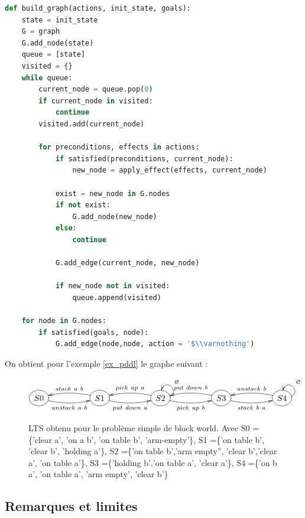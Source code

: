 \hfill
\begin{lstlisting}[language=Python, basicstyle=\small\ttfamily,
                   commentstyle=\color{gray}\itshape,
                   keywordstyle=\bfseries]
def build_graph(actions, init_state, goals):
    state = init_state
    G = graph
    G.add_node(state)
    queue = [state]
    visited = {}
    while queue:
        current_node = queue.pop(0)
        if current_node in visited:
            continue
        visited.add(current_node)

        for preconditions, effects in actions:
            if satisfied(preconditions, current_node):
                new_node = apply_effect(effects, current_node)

            exist = new_node in G.nodes
            if not exist:
                G.add_node(new_node)
            else:
                continue
            
            G.add_edge(current_node, new_node)

            if new_node not in visited:
                queue.append(visited)
    
    for node in G.nodes:
        if satisfied(goals, node):
            G.add_edge(node,node, action = '$\\varnothing')

\end{lstlisting}
\hfill

On obtient pour l'exemple \ref{ex_pddl} le graphe suivant :

\begin{figure}[h!]
    \[
        \xymatrix @R=0.1em @C=5em {
            *++[o][F-]{S0} \ar@/_/[r]_{unstack\ a\ b} & 
            *++[o][F-]{S1} \ar@/_/[l]_{stack\ a\ b} \ar@/_/[r]_{put\ down\ a} &
            *++[o][F-]{S2} \ar@/_/[l]_{pick\ up\ a} \ar@/_/[r]_{pick\ up\ b} \ar@(r,u)[]_{\varnothing} &
            *++[o][F-]{S3} \ar@/_/[l]_{put\ down\ b} \ar@/_/[r]_{stack\ b\ a} &
            *++[o][F-]{S4} \ar@/_/[l]_{unstack\ b} \ar@(r,u)[]_{\varnothing}
        }
    \]
    \centering
    \captionsetup{width=0.8\textwidth}
    \caption{LTS obtenu pour le problème simple de block world. Avec S0 =\{'clear a', 'on a b', 'on table b', 'arm-empty'\}, S1 =\{'on table b', 'clear b', 'holding a'\}, S2 =\{'on table b','arm empty'', 'clear b','clear a', 'on table a'\}, S3 =\{'holding b','on table a', 'clear a'\}, S4 =\{'on b a', 'on table a', 'arm empty', 'clear b'\}}
    \label{fig:exemple graphe BW}
\end{figure}

\subsection{Remarques et limites}


